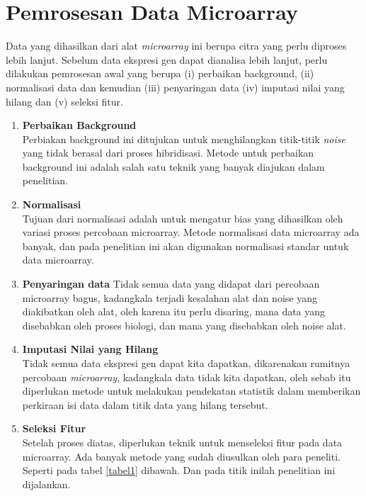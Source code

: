 \section{Pemrosesan Data Microarray}
Data yang dihasilkan dari alat \textit{microarray} ini berupa citra yang perlu diproses lebih lanjut. Sebelum data ekspresi gen dapat dianalisa lebih lanjut, perlu dilakukan pemrosesan awal yang berupa (i) perbaikan background, (ii) normalisasi data dan kemudian (iii) penyaringan data (iv) imputasi nilai yang hilang dan (v) seleksi fitur.
\begin{enumerate}
\item{\textbf{Perbaikan Background}}\\
Perbiakan background ini ditujukan untuk menghilangkan titik-titik \textit{noise} yang tidak berasal dari proses hibridisasi. Metode untuk perbaikan background ini adalah salah satu teknik yang banyak diajukan dalam penelitian\citep{fakoorusing}. 
\item{\textbf{Normalisasi}}\\
Tujuan dari normalisasi adalah untuk mengatur bias yang dihasilkan oleh variasi proses percobaan microarray. Metode normalisasi data microarray ada banyak, dan pada penelitian ini akan digunakan normalisasi standar untuk data microarray.
\item{\textbf{Penyaringan data}}
Tidak semua data yang didapat dari percobaan microarray bagus, kadangkala terjadi kesalahan alat dan noise yang diakibatkan oleh alat, oleh karena itu perlu disaring, mana data yang disebabkan oleh proses biologi, dan mana yang disebabkan oleh noise alat.
\item{\textbf{Imputasi Nilai yang Hilang}}\\
Tidak semua data ekspresi gen dapat kita dapatkan, dikarenakan rumitnya percobaan \textit{microarray}, kadangkala data tidak kita dapatkan, oleh sebab itu diperlukan metode untuk melakukan pendekatan statistik dalam memberikan perkiraan isi data dalam titik data yang hilang tersebut.
\item{\textbf{Seleksi Fitur}}\\
Setelah proses diatas, diperlukan teknik untuk menseleksi fitur pada data microarray. Ada banyak metode yang sudah diusulkan oleh para peneliti. Seperti pada tabel \ref{tabel1} dibawah. Dan pada titik inilah penelitian ini dijalankan.
\end{enumerate}

